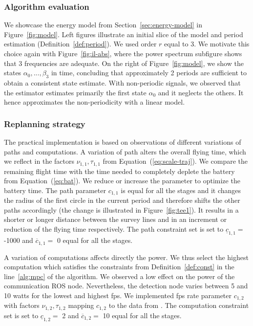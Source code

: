 \subsubsection*{Algorithm evaluation}


We showcase the energy model from Section~\ref{sec:energy-model} in Figure~\ref{fig:model}. Left figures illustrate an initial slice of the model and period estimation (Definition~\ref{def:period}). We used order $r$ equal to 3. We motivate this choice again with Figure~\ref{fig:il-abs}, where the power spectrum subfigure shows that 3 frequencies are adequate. On the right of Figure~\ref{fig:model}, we show the states $\alpha_0,...,\beta_3$ in time, concluding that approximately 2 periods are sufficient to obtain a consistent state estimate. With non-periodic signals, we observed that the estimator estimates primarily the first state $\alpha_0$ and it neglects the others. It hence approximates the non-periodicity with a linear model.

\subsubsection*{Replanning strategy}

The practical implementation is based on observations of different variations of paths and computations. A variation of path alters the overall flying time, which we reflect in the factors $\nu_{1,1},\tau_{1,1}$ from Equation~(\ref{eq:scale-traj}). We compare the remaining flight time with the time needed to completely deplete the battery from Equation~(\ref{eq:bat}). We reduce or increase the parameter to optimize the battery time. The path parameter $c_{1,1}$ is equal for all the stages and it changes the radius of the first circle in the current period and therefore shifts the other paths accordingly (the change is illustrated in Figure~\ref{fig:tee1}). It results in a shorter or longer distance between the survey lines and in an increment or reduction of the flying time respectively. The path constraint set is set to $\underline{c}_{1,1}=$ -1000 and $\overline{c}_{1,1}=$ 0 equal for all the stages.

A variation of computations affects directly the power. We thus select the highest computation which satisfies the constraints from Definition~\ref{def:const} in the line~\ref{alg:mpc} of the algorithm. We observed a low effect on the power of the communication ROS node. Nevertheless, the detection node varies between 5 and 10 watts for the lowest and highest fps. We implemented fps rate parameter $c_{1,2}$ with factors  $\nu_{1,2},\tau_{1,2}$ mapping $c_{1,2}$ to the data from \powprof{}. The computation constraint set is set to $\underline{c}_{1,2}=$ 2 and $\overline{c}_{1,2}=$ 10 equal for all the stages.

